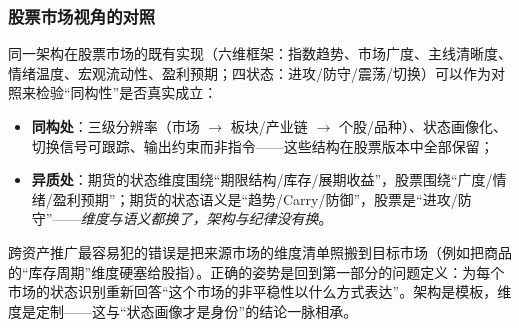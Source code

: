 \subsubsection{股票市场视角的对照}

同一架构在股票市场的既有实现（六维框架：指数趋势、市场广度、主线清晰度、情绪温度、宏观流动性、盈利预期；四状态：进攻/防守/震荡/切换）可以作为对照来检验“同构性”是否真实成立：

\begin{itemize}[itemsep=2pt]
\item \textbf{同构处}：三级分辨率（市场 $\to$ 板块/产业链 $\to$ 个股/品种）、状态画像化、切换信号可跟踪、输出约束而非指令——这些结构在股票版本中全部保留；
\item \textbf{异质处}：期货的状态维度围绕“期限结构/库存/展期收益”，股票围绕“广度/情绪/盈利预期”；期货的状态语义是“趋势/Carry/防御”，股票是“进攻/防守”——\emph{维度与语义都换了，架构与纪律没有换}。
\end{itemize}

\begin{remark}[推广的正确姿势]
跨资产推广最容易犯的错误是把来源市场的维度清单照搬到目标市场（例如把商品的“库存周期”维度硬塞给股指）。正确的姿势是回到第一部分的问题定义：为每个市场的状态识别重新回答“这个市场的非平稳性以什么方式表达”。架构是模板，维度是定制——这与“状态画像才是身份”的结论一脉相承。
\end{remark}

